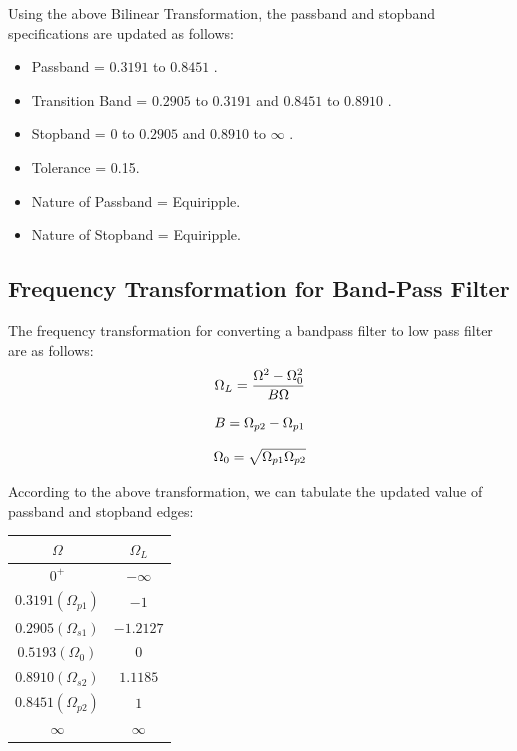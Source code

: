 \documentclass{article}
\begin{document}
Using the above Bilinear Transformation, the passband and stopband specifications are updated as follows:\\

\begin{itemize}
    \item Passband = $0.3191$ to $0.8451$ .
    \item Transition Band = $0.2905$ to $0.3191$ and $0.8451$ to $0.8910$ .
    \item Stopband = $0$ to $0.2905$  and $0.8910$ to $\infty$ .
    \item Tolerance = 0.15.
    \item Nature of Passband = Equiripple.
    \item Nature of Stopband = Equiripple.
\end{itemize}

\subsection{Frequency Transformation for Band-Pass Filter}
The frequency transformation for converting a bandpass filter to low pass filter are as follows:\\

\begin{equation}
    \Omega _{L} = \frac{\Omega^{2} - \Omega_{0}^{2}}{B\Omega}  \\
\end{equation}

\begin{equation}
    B = \Omega _{p2} - \Omega _{p1} \\
\end{equation}

\begin{equation}
    \Omega _{0} = \sqrt{\Omega _{p1}\Omega _{p2}}\\
\end{equation}

According to the above transformation, we can tabulate the updated value of passband and stopband edges:\\

\begin{table}[h]
    \centering
    \begin{tabular}{|c|c|}
        \hline
       $\Omega$ & $\Omega _{L}$\\
       \hline
       $0^+$  & $-\infty$   \\
       \hline
       $0.3191 (\Omega_{p1})$  & $-1$   \\
       \hline
        $0.2905 (\Omega_{s1})$  & $-1.2127$   \\
       \hline
       $0.5193 (\Omega_{0})$  & $0$   \\
       \hline
       $0.8910 (\Omega_{s2})$  & $1.1185$   \\
       \hline
       $0.8451 (\Omega_{p2})$  & $1$   \\
       \hline
       $\infty$  & $\infty$   \\
       \hline
    \end{tabular}
\end{table}
\end{document}
